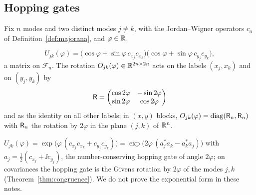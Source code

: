 \subsection{Hopping gates}
\label{sec:gate}
Fix $n$ modes and two distinct modes $j\neq k$, with the Jordan--Wigner operators $c_a$ of
Definition~\ref{def:majorana}, and $\varphi\in\mathbb R$.

\begin{definition}\label{def:gate}
\[
 U_{jk}(\varphi)=\bigl(\cos\varphi+\sin\varphi\,c_{x_j}c_{x_k}\bigr)\bigl(\cos\varphi+\sin\varphi\,c_{y_j}c_{y_k}\bigr),
\]
a matrix on $\mathcal F_n$. The rotation $O_{jk}(\varphi)\in\mathbb R^{2n\times2n}$ acts on the labels
$(x_j,x_k)$ and on $(y_j,y_k)$ by
\[
 \mathsf R=\begin{pmatrix}\cos2\varphi&-\sin2\varphi\\
\sin2\varphi&\cos2\varphi\end{pmatrix}
\]
and as the identity on all other labels;
in $(x,y)$ blocks, $O_{jk}(\varphi)=\operatorname{diag}(\mathsf R_n,\mathsf R_n)$ with $\mathsf R_n$ the
rotation by $2\varphi$ in the plane $(j,k)$ of $\mathbb R^n$.
\end{definition}
$U_{jk}(\varphi)=\exp\bigl(\varphi\,(c_{x_j}c_{x_k}+c_{y_j}c_{y_k})\bigr)
=\exp\bigl(2\varphi\,(a_j^*a_k-a_k^*a_j)\bigr)$ with
$a_j=\tfrac12(c_{x_j}+\ii c_{y_j})$, the number-conserving hopping gate of angle
$2\varphi$; on covariances the hopping gate is the Givens rotation by $2\varphi$ of the modes
$j,k$ (Theorem~\ref{thm:congruence}). We do not prove the exponential form in these notes.

